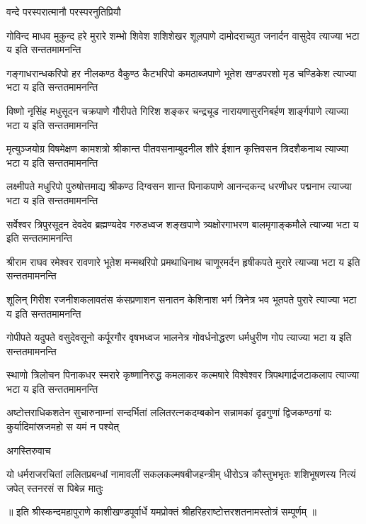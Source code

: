 
{वन्दे परस्परात्मानौ परस्परनुतिप्रियौ}

\fourlineindentedshloka
{गोविन्द माधव मुकुन्द हरे मुरारे}
{शम्भो शिवेश शशिशेखर शूलपाणे}
{दामोदराच्युत जनार्दन वासुदेव}
{त्याज्या भटा य इति सन्ततमामनन्ति}

\fourlineindentedshloka
{गङ्गाधरान्धकरिपो हर नीलकण्ठ}
{वैकुण्ठ कैटभरिपो कमठाब्जपाणे}
{भूतेश खण्डपरशो मृड चण्डिकेश}
{त्याज्या भटा य इति सन्ततमामनन्ति}

\fourlineindentedshloka
{विष्णो नृसिंह मधुसूदन चक्रपाणे}
{गौरीपते गिरिश शङ्कर चन्द्रचूड}
{नारायणासुरनिबर्हण शार्ङ्गपाणे}
{त्याज्या भटा य इति सन्ततमामनन्ति}

\fourlineindentedshloka
{मृत्युञ्जयोग्र विषमेक्षण कामशत्रो}
{श्रीकान्त पीतवसनाम्बुदनील शौरे}
{ईशान कृत्तिवसन त्रिदशैकनाथ}
{त्याज्या भटा य इति सन्ततमामनन्ति}

\fourlineindentedshloka
{लक्ष्मीपते मधुरिपो पुरुषोत्तमाद्य}
{श्रीकण्ठ दिग्वसन शान्त पिनाकपाणे}
{आनन्दकन्द धरणीधर पद्मनाभ}
{त्याज्या भटा य इति सन्ततमामनन्ति}

\fourlineindentedshloka
{सर्वेश्वर त्रिपुरसूदन देवदेव}
{ब्रह्मण्यदेव गरुडध्वज शङ्खपाणे}
{त्र्यक्षोरगाभरण बालमृगाङ्कमौले}
{त्याज्या भटा य इति सन्ततमामनन्ति}

\fourlineindentedshloka
{श्रीराम राघव रमेश्वर रावणारे}
{भूतेश मन्मथरिपो प्रमथाधिनाथ}
{चाणूरमर्दन हृषीकपते मुरारे}
{त्याज्या भटा य इति सन्ततमामनन्ति}

\fourlineindentedshloka
{शूलिन् गिरीश रजनीशकलावतंस}
{कंसप्रणाशन सनातन केशिनाश}
{भर्ग त्रिनेत्र भव भूतपते पुरारे}
{त्याज्या भटा य इति सन्ततमामनन्ति}

\fourlineindentedshloka
{गोपीपते यदुपते वसुदेवसूनो}
{कर्पूरगौर वृषभध्वज भालनेत्र}
{गोवर्धनोद्धरण धर्मधुरीण गोप}
{त्याज्या भटा य इति सन्ततमामनन्ति}

\fourlineindentedshloka
{स्थाणो त्रिलोचन पिनाकधर स्मरारे}
{कृष्णानिरुद्ध कमलाकर कल्मषारे}
{विश्वेश्वर त्रिपथगार्द्रजटाकलाप}
{त्याज्या भटा य इति सन्ततमामनन्ति}

\fourlineindentedshloka
{अष्टोत्तराधिकशतेन सुचारुनाम्नां}
{सन्दर्भितां ललितरत्नकदम्बकोन}
{सन्नामकां दृढगुणां द्विजकण्ठगां यः}
{कुर्यादिमांस्रजमहो स यमं न पश्येत्}

{अगस्तिरुवाच}

\fourlineindentedshloka
{यो धर्मराजरचितां ललितप्रबन्धां}
{नामावलीं सकलकल्मषबीजहन्त्रीम्}
{धीरोऽत्र कौस्तुभभृतः शशिभूषणस्य}
{नित्यं जपेत् स्तनरसं स पिबेन्न मातुः}

{॥ इति श्रीस्कन्दमहापुराणे काशीखण्डपूर्वार्धे यमप्रोक्तं श्रीहरिहराष्टोत्तरशतनामस्तोत्रं सम्पूर्णम् ॥}